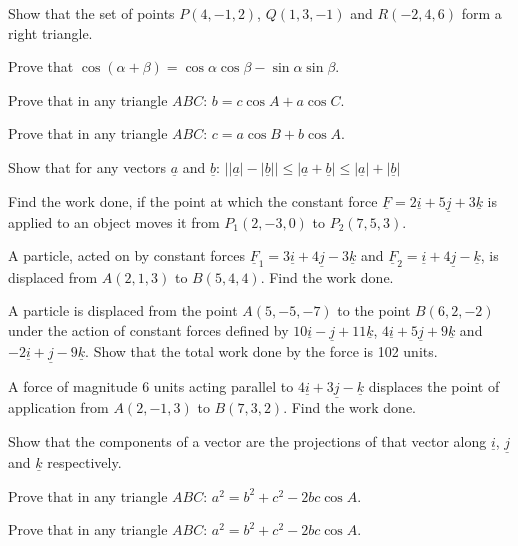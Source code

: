 \documentclass[11pt,a4paper]{article}
\begin{document}
\begin{longlist}
\item Show that the set of points $P(4,-1,2)$, $Q(1,3,-1)$ and $R(-2,4,6)$ form a right triangle.

\item Prove that $\cos(\alpha+\beta)=\cos\alpha\cos\beta - \sin\alpha\sin\beta$.

\item Prove that in any triangle $ABC$: $b=c\cos A + a\cos C$.

\item Prove that in any triangle $ABC$: $c=a\cos B + b\cos A$.

\item Show that for any vectors $\underline{a}$ and $\underline{b}$: $\big||\underline{a}|-|\underline{b}|\big| \leq |\underline{a}+\underline{b}| \leq |\underline{a}|+|\underline{b}|$

\item Find the work done, if the point at which the constant force $\underline{F}=2\underline{i}+5\underline{j}+3\underline{k}$ is applied to an object moves it from $P_1(2,-3,0)$ to $P_2(7,5,3)$.

\item A particle, acted on by constant forces $\underline{F}_1=3\underline{i}+4\underline{j}-3\underline{k}$ and $\underline{F}_2=\underline{i}+4\underline{j}-\underline{k}$, is displaced from $A(2,1,3)$ to $B(5,4,4)$. Find the work done.

\item A particle is displaced from the point $A(5,-5,-7)$ to the point $B(6,2,-2)$ under the action of constant forces defined by $10\underline{i}-\underline{j}+11\underline{k}$, $4\underline{i}+5\underline{j}+9\underline{k}$ and $-2\underline{i}+\underline{j}-9\underline{k}$. Show that the total work done by the force is 102 units.

\item A force of magnitude 6 units acting parallel to $4\underline{i}+3\underline{j}-\underline{k}$ displaces the point of application from $A(2,-1,3)$ to $B(7,3,2)$. Find the work done.

\item Show that the components of a vector are the projections of that vector along $\underline{i}$, $\underline{j}$ and $\underline{k}$ respectively.

\item Prove that in any triangle $ABC$: $a^2=b^2+c^2-2bc\cos A$.

\item Prove that in any triangle $ABC$: $a^2=b^2+c^2-2bc\cos A$.


\end{longlist}
\end{document}
